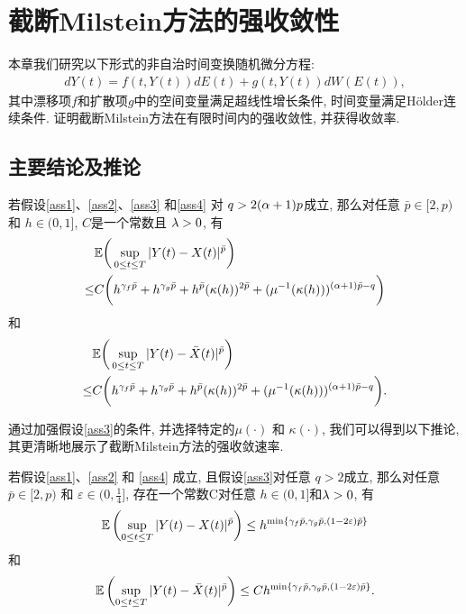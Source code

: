 

\chapter{截断Milstein方法的强收敛性}

本章我们研究以下形式的非自治时间变换随机微分方程:
\begin{align*}
    dY(t) = f(t,Y(t))dE(t) + g(t,Y(t))dW(E(t)),
\end{align*}
其中漂移项$f$和扩散项$g$中的空间变量满足超线性增长条件, 时间变量满足H{\"o}lder连续条件. 证明截断Milstein方法在有限时间内的强收敛性, 并获得收敛率.

\section{主要结论及推论}
\begin{theorem}
    \label{theorem3-2}
    若假设\ref{ass1}、\ref{ass2}、\ref{ass3} 和\ref{ass4} 对 $q>2(\alpha+1)p$成立, 那么对任意 $\bar{p}\in [2,p)$ 和 $h \in (0,1]$, $C$是一个常数且 $\lambda > 0$, 有
    \begin{align}
        \label{th321}
        &\mathbb{E} \bigg( \sup_{0\leq t\leq T}|Y(t)-X(t)|^{\bar{p}} \bigg) \nonumber\\
        \leq& C\bigg(h^{\gamma_f\bar{p}}+h^{\gamma_g\bar{p}}+h^{\bar{p}}(\kappa(h))^{2\bar{p}}+(\mu^{-1}(\kappa(h)))^{(\alpha+1)\bar{p}-q}\bigg)
    \end{align}
    和
    \begin{align}
        \label{th322}
        &\mathbb{E}\bigg(\sup_{0\leq t\leq T}|Y(t)-\bar{X}(t)|^{\bar{p}}\bigg)\nonumber\\
        \leq& C\bigg(h^{\gamma_f\bar{p}}+h^{\gamma_g\bar{p}}+h^{\bar{p}}(\kappa(h))^{2\bar{p}}+(\mu^{-1}(\kappa(h)))^{(\alpha+1)\bar{p}-q}\bigg).
    \end{align}
\end{theorem}
通过加强假设\ref{ass3}的条件, 并选择特定的$\mu(\cdot)$ 和 $\kappa (\cdot)$, 我们可以得到以下推论, 其更清晰地展示了截断Milstein方法的强收敛速率.
\begin{corollary}
    \label{theorem3-1}
    若假设\ref{ass1}、\ref{ass2} 和 \ref{ass4} 成立, 且假设\ref{ass3}对任意 $q>2$成立, 那么对任意 $\bar{p}\in [2,p)$ 和 $\varepsilon\in(0,\frac{1}{4}]$, 存在一个常数C对任意 $h \in (0,1]$和$\lambda > 0$, 有
    \begin{align}
        \label{th311}
        \mathbb{E}\left( \sup_{0\leq t\leq T}|Y(t)-X(t)|^{\bar{p}}\right)\leq h^{\min\{\gamma_f\bar{p},\gamma_g\bar{p},(1-2\varepsilon)\bar{p}\}}
    \end{align}
    和
    \begin{align}
        \label{th312}
        \mathbb{E}\left( \sup_{0\leq t\leq T}|Y(t)-\bar{X}(t)|^{\bar{p}}\right)\leq Ch^{\min\{\gamma_f\bar{p},\gamma_g\bar{p},(1-2\varepsilon)\bar{p}\}}.
    \end{align}
\end{corollary}

